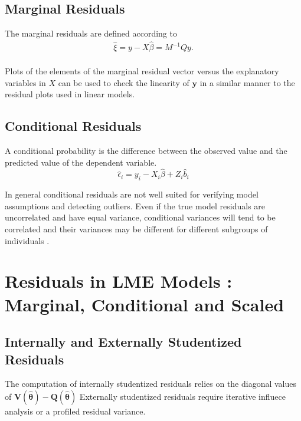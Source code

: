 \documentclass[12pt, a4paper]{report}
\theoremstyle{plain}
\theoremstyle{definition}
\theoremstyle{remark}
\begin{document}
		\subsection{Marginal Residuals}
		The marginal residuals are defined according to
		\begin{eqnarray*}
			\hat{\xi} = y - X\hat{\beta} = M^{-1}Qy. \\\nonumber
		\end{eqnarray*}
		
		Plots of the elements of the marginal residual vector versus the explanatory variables in $X$ can be used to check the linearity of $\boldsymbol{y}$ in a similar manner to the residual plots used in linear models.
		\subsection{Conditional Residuals}
		A conditional probability is the difference between the observed value and the predicted value of the dependent variable.
		\begin{equation*}
		\hat{\epsilon}_{i} = y_{i} - X_{i}\hat{\beta} + Z_{i}\hat{b}_{i}
		\end{equation*}
		
		In general conditional residuals are not well suited for verifying model assumptions and detecting outliers. Even if the true model residuals are uncorrelated and have equal variance, conditional variances will tend to be correlated and their variances may be different for different subgroups of individuals \citep{west}.
		

	\section{Residuals in LME Models : Marginal, Conditional and Scaled}
\subsection{Internally and Externally Studentized Residuals}
The computation of internally studentized residuals relies on the diagonal values of $\boldsymbol{V(\hat{\theta})} - \boldsymbol{Q(\hat{\theta})}$
Externally studentized residuals require iterative influece analysis or a profiled residual variance.
\end{document}
